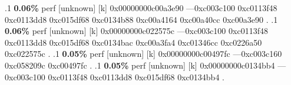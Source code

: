 \begin{profile}
{.1 \textbf{ 0.06\%} perf             [unknown]              [k] 0x00000000c00a3e90\newline {} ---0xc003c100\newline {} 0xc0113f48\newline {} 0xc0113dd8\newline {} 0xc015df68\newline {} 0xc0134b88\newline {} 0xc00a4164\newline {} 0xc00a40cc\newline {} 0xc00a3e90\newline {} . 
.1 \textbf{ 0.06\%} perf             [unknown]              [k] 0x00000000c022575c\newline {} ---0xc003c100\newline {} 0xc0113f48\newline {} 0xc0113dd8\newline {} 0xc015df68\newline {} 0xc0134bac\newline {} 0xc00a3fa4\newline {} 0xc01346cc\newline {} 0xc0226a50\newline {} 0xc022575c\newline {} . 
.1 \textbf{ 0.05\%} perf             [unknown]              [k] 0x00000000c00497fc\newline {} ---0xc003c160\newline {} 0xc058209c\newline {} 0xc00497fc\newline {} . 
.1 \textbf{ 0.05\%} perf             [unknown]              [k] 0x00000000c0134bb4\newline {} ---0xc003c100\newline {} 0xc0113f48\newline {} 0xc0113dd8\newline {} 0xc015df68\newline {} 0xc0134bb4\newline {} . 
}
\end{profile}
